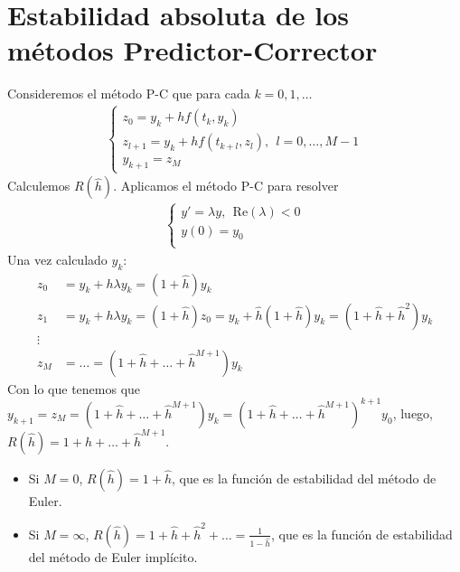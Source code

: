 \section{Estabilidad absoluta de los métodos Predictor-Corrector}
\noindent Consideremos el método P-C que para cada $k = 0,1,\ldots$
\begin{align*}
    \left\{ \begin{array}{lcc}
        z_0 = y_k + hf(t_k,y_k)\\
        z_{l+1} = y_k + hf(t_{k+l},z_l), \ \ l = 0,\ldots,M-1 \\
        y_{k+1} = z_M
    \end{array}
   \right.
\end{align*}
Calculemos $R(\hat{h})$. Aplicamos el método P-C para resolver
\begin{align*}
            \left\{ \begin{array}{lcc}
             y' = \lambda y, \ \ \text{Re}(\lambda) < 0\\
             y(0) = y_0 \\
             \end{array}
   \right.
\end{align*}
Una vez calculado $y_k$:
\begin{align*}
    z_0 &= y_k + h\lambda y_k = (1 + \hat{h})y_k \\
    z_1 &= y_k + h\lambda y_k = (1 + \hat{h})z_0 = y_k + \hat{h}(1 + \hat{h})y_k = (1 + \hat{h} + \hat{h}^2)y_k \\
    \vdots \\
    z_M &= \ldots = (1 + \hat{h} + \ldots + \hat{h}^{M+1})y_k
\end{align*}
Con lo que tenemos que $y_{k+1} = z_M = (1 + \hat{h} + \ldots + \hat{h}^{M+1})y_k = (1 + \hat{h} + \ldots + \hat{h}^{M+1})^{k+1}y_0$, luego, $R(\hat{h}) = 1 + \hat{h} + \ldots + \hat{h}^{M+1}$.
\begin{itemize}
    \item Si $M = 0$, $R(\hat{h}) = 1 + \hat{h}$, que es la función de estabilidad del método de Euler.
    \item Si $M = \infty$, $R(\hat{h}) = 1 + \hat{h} + \hat{h}^2 + \ldots = \frac{1}{ 1- \hat{h}}$, que es la función de estabilidad del método de Euler implícito.
\end{itemize}
